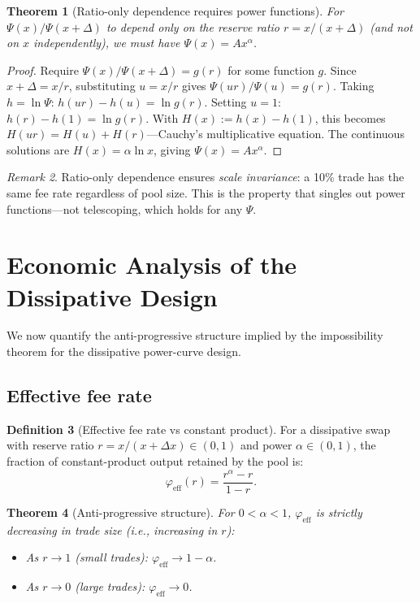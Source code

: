 \documentclass[11pt]{article}
\newtheorem{theorem}{Theorem}[section]
\theoremstyle{definition}
\newtheorem{definition}[theorem]{Definition}
\theoremstyle{remark}
\newtheorem{remark}[theorem]{Remark}
\newcommand{\dx}{\Delta x}
\begin{document}
\begin{theorem}[Ratio-only dependence requires power functions]\label{thm:ratio-only}
For $\Psi(x)/\Psi(x+\Delta)$ to depend only on the reserve ratio $r=x/(x+\Delta)$ (and not on $x$ independently), we must have $\Psi(x)=Ax^\alpha$.
\end{theorem}

\begin{proof}
Require $\Psi(x)/\Psi(x+\Delta)=g(r)$ for some function $g$.
Since $x+\Delta=x/r$, substituting $u=x/r$ gives $\Psi(ur)/\Psi(u)=g(r)$.
Taking $h=\ln\Psi$: $h(ur)-h(u)=\ln g(r)$.
Setting $u=1$: $h(r)-h(1)=\ln g(r)$.
With $H(x):=h(x)-h(1)$, this becomes $H(ur)=H(u)+H(r)$---Cauchy's multiplicative equation.
The continuous solutions are $H(x)=\alpha\ln x$, giving $\Psi(x)=Ax^\alpha$.
\end{proof}

\begin{remark}
Ratio-only dependence ensures \emph{scale invariance}: a 10\% trade has the same fee rate regardless of pool size.
This is the property that singles out power functions---not telescoping, which holds for any $\Psi$.
\end{remark}


\section{Economic Analysis of the Dissipative Design}\label{sec:economic}

We now quantify the anti-progressive structure implied by the impossibility theorem for the dissipative power-curve design.

\subsection{Effective fee rate}

\begin{definition}[Effective fee rate vs constant product]
For a dissipative swap with reserve ratio $r=x/(x+\dx)\in(0,1)$ and power $\alpha\in(0,1)$, the fraction of constant-product output retained by the pool is:
\begin{equation}\label{eq:phi-eff}
\varphi_{\mathrm{eff}}(r) = \frac{r^\alpha - r}{1-r}.
\end{equation}
\end{definition}

\begin{theorem}[Anti-progressive structure]\label{thm:anti-prog}
For $0<\alpha<1$, $\varphi_{\mathrm{eff}}$ is strictly decreasing in trade size (i.e., increasing in $r$):
\begin{itemize}
\item As $r\to 1$ (small trades): $\varphi_{\mathrm{eff}}\to 1-\alpha$.
\item As $r\to 0$ (large trades): $\varphi_{\mathrm{eff}}\to 0$.
\end{itemize}
\end{theorem}
\end{document}
